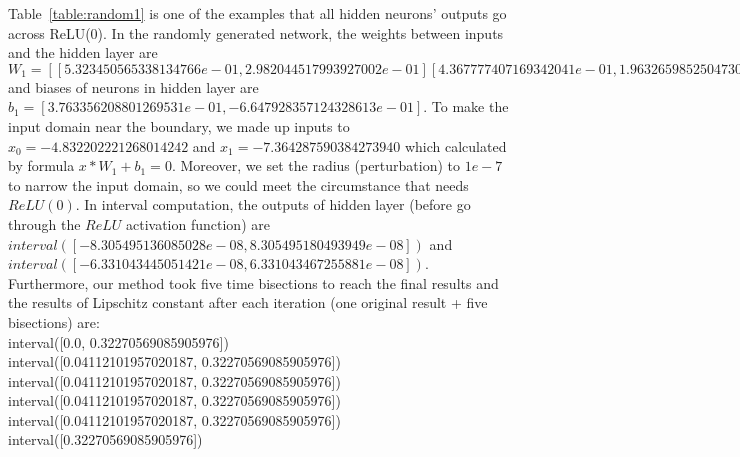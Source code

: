 \documentclass[11pt]{article}
\begin{document}
Table~\ref{table:random1} is one of the examples that all hidden neurons' outputs go across ReLU(0). In the randomly generated network, the weights between inputs and the hidden layer are $W_1=[[5.323450565338134766e-01,2.982044517993927002e-01]
[4.367777407169342041e-01,1.963265985250473022e-01]]$ and biases of neurons in hidden layer are $b_1 = [3.763356208801269531e-01,-6.647928357124328613e-01]$. To make the input domain near the boundary, we made up inputs to $x_0=-4.832202221268014242$ and $x_1=-7.364287590384273940$ which calculated by formula $x*W_1+b_1=0$. Moreover, we set the radius (perturbation) to $1e-7$ to narrow the input domain, so we could meet the circumstance that needs $ReLU(0)$.
In interval computation, the outputs of hidden layer (before go through the $ReLU$ activation function) are $interval([-8.305495136085028e-08, 8.305495180493949e-08])
$ and $interval([-6.331043445051421e-08, 6.331043467255881e-08])$. Furthermore, our method took five time bisections to reach the final results and the results of Lipschitz constant after each iteration (one original result + five bisections) are:\\
interval([0.0, 0.32270569085905976])\\
interval([0.04112101957020187, 0.32270569085905976])\\
interval([0.04112101957020187, 0.32270569085905976])\\
interval([0.04112101957020187, 0.32270569085905976])\\
interval([0.04112101957020187, 0.32270569085905976])\\
interval([0.32270569085905976])
\end{document}
